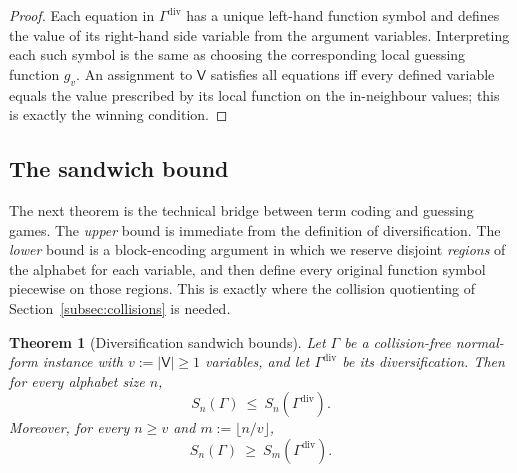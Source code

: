\documentclass[11pt]{article}
\theoremstyle{definition}
\theoremstyle{plain}
\newtheorem{theorem}[definition]{Theorem}
\newcommand{\Vars}{\mathsf{V}}
\newcommand{\Sn}{S_n}
\begin{document}
\begin{proof}
Each equation in $\Gamma^{\mathrm{div}}$ has a unique left-hand function symbol and defines the value of its
right-hand side variable from the argument variables.
Interpreting each such symbol is the same as choosing the corresponding local guessing function $g_v$.
An assignment to $\Vars$ satisfies all equations iff every defined variable equals the value prescribed by
its local function on the in-neighbour values; this is exactly the winning condition.
\end{proof}


\subsection{The sandwich bound}
The next theorem is the technical bridge between term coding and guessing games.
The \emph{upper} bound is immediate from the definition of diversification.
The \emph{lower} bound is a block-encoding argument in which we reserve disjoint \emph{regions} of the alphabet
for each variable, and then define every original function symbol piecewise on those regions.
This is exactly where the collision quotienting of Section~\ref{subsec:collisions} is needed.

\begin{theorem}[Diversification sandwich bounds]
\label{thm:sandwich}
Let $\Gamma$ be a collision-free normal-form instance with $v:=|\Vars|\ge 1$ variables, and let
$\Gamma^{\mathrm{div}}$ be its diversification.
Then for every alphabet size $n$,
\[
\Sn(\Gamma)\ \le\ \Sn(\Gamma^{\mathrm{div}}).
\]
Moreover, for every $n\ge v$ and $m:=\lfloor n/v\rfloor$,
\[
\Sn(\Gamma)\ \ge\ S_m(\Gamma^{\mathrm{div}}).
\]
\end{theorem}
\end{document}
